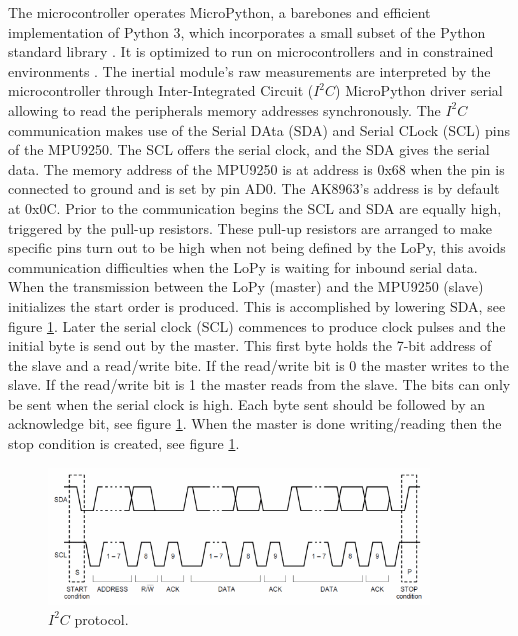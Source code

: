 The microcontroller operates MicroPython, a barebones and efficient implementation of Python 3, which incorporates a small subset of the Python standard library \cite{micropython}. It is optimized to run on microcontrollers and in constrained environments \cite{tollervey2017programming}. The inertial module's raw measurements are interpreted by the microcontroller through Inter-Integrated Circuit ($I^2C$) MicroPython driver serial allowing to read the peripherals memory addresses synchronously. The $I^2C$ communication makes use of the Serial DAta (SDA) and Serial CLock (SCL) pins of the MPU9250. The SCL offers the serial clock, and the SDA gives the serial data. The memory address of the MPU9250 is at address is 0x68 when the pin is connected to ground and is set by pin AD0. The AK8963’s address is by default at 0x0C. Prior to the communication begins the SCL and SDA are equally high, triggered by the pull-up resistors. These pull-up resistors are arranged to make specific pins turn out to be high when not being defined by the LoPy, this avoids communication difficulties when the LoPy is waiting for inbound serial data.
When the transmission between the LoPy (master) and the MPU9250 (slave) initializes the start order is produced. This is accomplished by lowering SDA, see figure \ref{fig:i2c}. Later the serial clock (SCL) commences to produce clock pulses and the initial byte is send out by the master. This first byte holds the 7-bit address of the slave and a read/write bite. If the read/write bit is 0 the master writes to the slave. If the read/write bit is 1 the master reads from the slave. The bits can only be sent when the serial clock is high. Each byte sent should be followed by an acknowledge bit, see figure \ref{fig:i2c}. When the master is done writing/reading then the stop condition is created, see figure \ref{fig:i2c}.

\begin{figure}[!h]
  \centering
  \includegraphics[width=0.9\textwidth]{figures/i2c.png}
  \caption{ $I^2C$ protocol. }
  \label{fig:i2c}
\end{figure}

